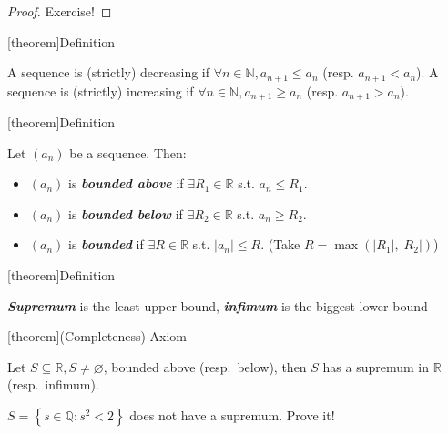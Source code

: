 \documentclass[12pt]{report}
\theoremstyle{definition}
\begin{document}
\begin{proof}
    Exercise!
\end{proof}

[theorem]{Definition}
\begin{increasing and decreasing sequence}
    A sequence is (strictly) decreasing if $\forall n\in \mathbb{N}, a_{n + 1}\le a_n$ (resp. $a_{n + 1} < a_n$).
    A sequence is (strictly) increasing if $\forall n \in \mathbb{N}, a_{n + 1}\ge a_n$ (resp. $a_{n + 1} > a_n$).
\end{increasing and decreasing sequence}


[theorem]{Definition}
\begin{bounded def}
    Let $(a_n)$ be a sequence. Then:
    \begin{itemize}
        \item $(a_n)$ is \textbf{\emph{bounded above}} if $\exists R_1 \in \mathbb{R}$ s.t. $a_n \le R_1$.

        \item $(a_n)$ is \textbf{\emph{bounded below}} if $\exists R_2 \in \mathbb{R}$ s.t. $a_n \ge R_2$.

        \item $(a_n)$ is \textbf{\emph{bounded}} if $\exists R \in \mathbb{R}$ s.t. $|a_n| \le R$.
            (Take $R = \max{(|R_1|, |R_2|)}$)
    \end{itemize}
\end{bounded def}

[theorem]{Definition}
\begin{infimum and supremum}
    \textbf{\emph{Supremum}} is the least upper bound, \textbf{\emph{infimum}} is the biggest lower bound
\end{infimum and supremum}

[theorem]{(Completeness) Axiom}
\begin{Completeness axiom}
    Let $S \subseteq \mathbb{R}, S \neq \varnothing$, bounded above (resp.\ below),
    then $S$ has a supremum in $\mathbb{R}$ (resp.\ infimum).
\end{Completeness axiom}

\begin{ex}
    $S = \left\{s \in \mathbb{Q} : s^{2} < 2\right\} $ does not have a supremum. Prove it!
\end{ex}
\end{document}
